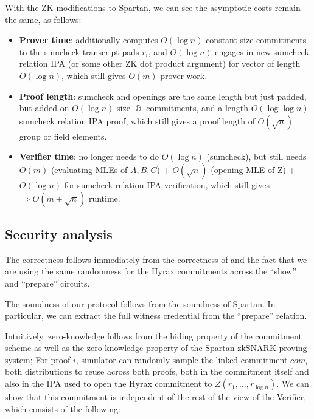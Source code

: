 With the ZK modifications to Spartan, we can see the asymptotic costs remain the same, as follows:

\begin{itemize}
    \item \textbf{Prover time}: additionally computes $O(\log n)$ constant-size commitments to the sumcheck transcript pads $r_i$, and $O(\log n)$ engages in new sumcheck relation IPA (or some other ZK dot product argument) for vector of length $O(\log n)$, which still gives $O(m)$ prover work.
    \item \textbf{Proof length}: sumcheck and openings are the same length but just padded, but added on $O(\log n)$ size $|\mathbb{G}|$ commitments, and a length $O(\log\log n)$ sumcheck relation IPA proof, which still gives a proof length of $O(\sqrt n)$ group or field elements.
    \item \textbf{Verifier time}: no longer needs to do $O(\log n)$ (sumcheck), but still needs $O(m)$ (evaluating MLEs of $A,B,C$) + $O(\sqrt{n})$ (opening MLE of Z) + $O(\log n)$ for sumcheck relation IPA verification, which still gives $\Rightarrow O(m + \sqrt{n})$ runtime.
\end{itemize}

\subsection{Security analysis}

The correctness follows immediately from the correctness of and the fact that we are using the same randomness for the Hyrax commitments across the ``show'' and ``prepare'' circuits.  

The soundness of our protocol follows from the soundness of Spartan. In particular, we can extract the full witness credential from the ``prepare'' relation.

Intuitively, zero-knowledge follows from the hiding property of the commitment scheme as well as the zero knowledge property of the Spartan zkSNARK proving system;
For proof $i$, simulator can randomly sample the linked commitment $com_i$ both distributions to reuse across both proofs, both in the commitment itself and also in the IPA used to open the Hyrax commitment to $Z(r_1, \dots, r_{\log{n}})$. 
We can show that this commitment is independent of the rest of the view of the Verifier, which consists of the following:

